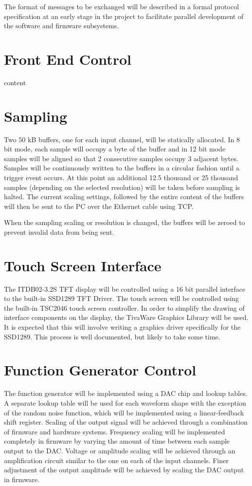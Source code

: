 \documentclass[12pt]{report}
\begin{document}
The format of messages to be exchanged will be described in a formal protocol specification at an early stage in the project to facilitate parallel development of the software and firmware subsystems.

\section{Front End Control}
content

\section{Sampling}
Two 50 kB buffers, one for each input channel, will be statically allocated. In 8 bit mode, each sample will occupy a byte of the buffer and in 12 bit mode samples will be aligned so that 2 consecutive samples occupy 3 adjacent bytes. Samples will be continuously written to the buffers in a circular fashion until a trigger event occurs. At this point an additional 12.5 thousand or 25 thousand samples (depending on the selected resolution) will be taken before sampling is halted. The current scaling settings, followed by the entire content of the buffers will then be sent to the PC over the Ethernet cable using TCP.

When the sampling scaling or resolution is changed, the buffers will be zeroed to prevent invalid data from being sent.

\section{Touch Screen Interface}
The ITDB02-3.2S TFT display will be controlled using a 16 bit parallel interface to the built-in SSD1289 TFT Driver. The touch screen will be controlled using the built-in TSC2046 touch screen controller. In order to simplify the drawing of interface components on the display, the TivaWare Graphics Library will be used. It is expected that this will involve writing a graphics driver specifically for the SSD1289. This process is well documented\cite{TIgrlib}, but likely to take some time.

\section{Function Generator Control}
The function generator will be implemented using a DAC chip and lookup tables. A separate lookup table will be used for each waveform shape with the exception of the random noise function, which will be implemented using a linear-feedback shift register. Scaling of the output signal will be achieved through a combination of firmware and hardware systems. Frequency scaling will be implemented completely in firmware by varying the amount of time between each sample output to the DAC. Voltage or amplitude scaling will be achieved through an amplification circuit similar to the one on each of the input channels. Finer adjustment of the output amplitude will be achieved by scaling the DAC output in firmware.
\end{document}

